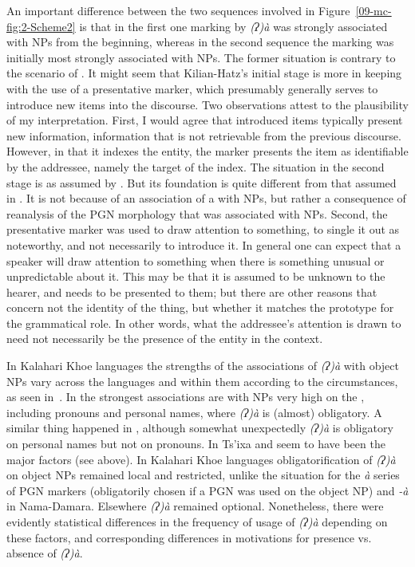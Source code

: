 \documentclass[output=paper]{LSP/langsci}
\begin{document}
An important difference between the two sequences involved in Figure~\ref{09-mc-fig:2-Scheme2} is that in the first one marking by \textit{(ʔ)à} was strongly associated with  NPs from the beginning, whereas in the second sequence the marking was initially most strongly associated with  NPs. The former situation is contrary to the scenario of \citet[376]{Kilian-Hatz2013Kxoe}. It might seem that Kilian-Hatz’s initial stage is more in keeping with the use of a presentative marker, which presumably generally serves to introduce new items into the discourse. Two observations attest to the plausibility of my interpretation. First, I would agree that introduced items typically present new information, information that is not retrievable from the previous discourse. However, in that it indexes the entity, the marker presents the item as identifiable by the addressee, namely the target of the index. The situation in the second stage is as assumed by \citet{Kilian-Hatz2013Kxoe}. But its foundation is quite different from that assumed in \citet[376]{Kilian-Hatz2013Kxoe}. It is not because of an association of a  with  NPs, but rather a consequence of reanalysis of the PGN morphology that was associated with  NPs. Second, the presentative marker was used to draw attention to something, to single it out as noteworthy, and not necessarily to introduce it. In general one can expect that a speaker will draw attention to something when there is something unusual or unpredictable about it. This may be that it is assumed to be unknown to the hearer, and needs to be presented to them; but there are other reasons that concern not the identity of the thing, but \eg whether it matches the prototype for the grammatical role. In other words, what the addressee’s attention is drawn to need not necessarily be the presence of the entity in the context.

In Kalahari Khoe languages the strengths of the associations of \textit{(ʔ)à} with object NPs vary across the languages and within them according to the circumstances, as seen in~. In  the strongest associations are with NPs very high on the , including pronouns and personal names, where \textit{(ʔ)à} is (almost) obligatory. A similar thing happened in , although somewhat unexpectedly \textit{(ʔ)à} is obligatory on personal names but not on pronouns. In Ts’ixa  and  seem to have been the major factors (see  above). In Kalahari Khoe languages obligatorification of \textit{(ʔ)à} on object NPs remained local and restricted, unlike the situation for the \textit{à} series of PGN markers (obligatorily chosen if a PGN was used on the object NP) and \textit{-à} in Nama-Damara. Elsewhere \textit{(ʔ)à} remained optional. Nonetheless, there were evidently statistical differences in the frequency of usage of \textit{(ʔ)à} depending on these factors, and corresponding differences in motivations for presence vs. absence of \textit{(ʔ)à}.
\end{document}
